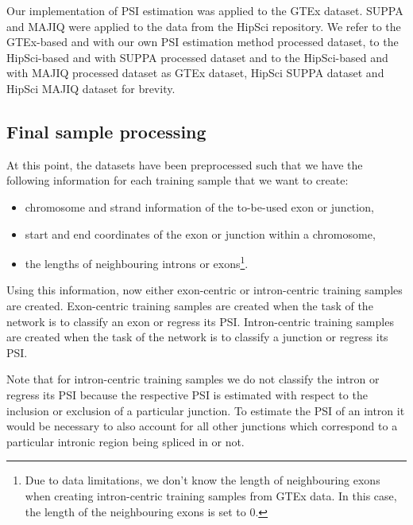 Our implementation of PSI estimation was applied to the GTEx dataset. SUPPA and MAJIQ were applied to the data from the HipSci repository. We refer to the GTEx-based and with our own PSI estimation method processed dataset, to the HipSci-based and with SUPPA processed dataset and to the HipSci-based and with MAJIQ processed dataset as GTEx dataset, HipSci SUPPA dataset and HipSci MAJIQ dataset for brevity. 
\subsection{Final sample processing} \label{subsec:finalsampleprocessing}



At this point, the datasets have been preprocessed such that we have the following information for each training sample that we want to create: 
\begin{itemize}
	\item chromosome and strand information of the to-be-used exon or junction,
	\item start and end coordinates of the exon or junction within a chromosome,
	\item the lengths of neighbouring introns or exons\footnote{Due to data limitations, we don't know the length of neighbouring exons when creating intron-centric training samples from GTEx data. In this case, the length of the neighbouring exons is set to 0. }.
\end{itemize}

Using this information, now either exon-centric or intron-centric training samples are created. Exon-centric training samples are created when the task of the network is to classify an exon or regress its PSI. Intron-centric training samples are created when the task of the network is to classify a junction or regress its PSI. 


Note that for intron-centric training samples we do not classify the intron or regress its PSI because the respective PSI is estimated with respect to the inclusion or exclusion of a particular junction. To estimate the PSI of an intron it would be necessary to also account for all other junctions which correspond to a particular intronic region being spliced in or not. 

